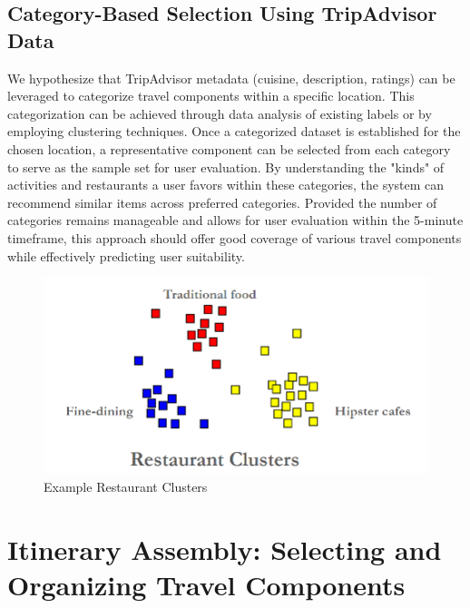 \documentclass[12pt,a4paper]{report}
\begin{document}
\subsection{Category-Based Selection Using TripAdvisor Data}
We hypothesize that TripAdvisor metadata (cuisine, description, ratings) can be leveraged to categorize travel components within a specific location.  This categorization can be achieved through data analysis of existing labels or by employing clustering techniques.  Once a categorized dataset is established for the chosen location, a representative component can be selected from each category to serve as the sample set for user evaluation.  By understanding the "kinds" of activities and restaurants a user favors within these categories, the system can recommend similar items across preferred categories.
Provided the number of categories remains manageable and allows for user evaluation within the 5-minute timeframe, this approach should offer good coverage of various travel components while effectively predicting user suitability.

\begin{figure}[H]
    \centering
    \includegraphics[scale=.8]{exrestaurantclusters}
    \caption{Example Restaurant Clusters}
\end{figure}

\section{Itinerary Assembly: Selecting and Organizing Travel Components}
\end{document}
